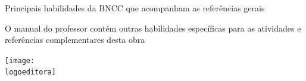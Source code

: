 \documentclass[smaller,professionalfonts,15pt]{beamer}
\begin{document}

\begin{frame}[plain]{Principais habilidades da BNCC que acompanham as referências gerais}
\vspace{-2cm}


\vfill
	{\small O manual do professor contém outras habilidades específicas para as atividades e referências complementares desta obra}

\end{frame}




\begin{frame}
\centering\hfill\texttt{[image: \\logoeditora]}
\end{frame}
\end{document}
